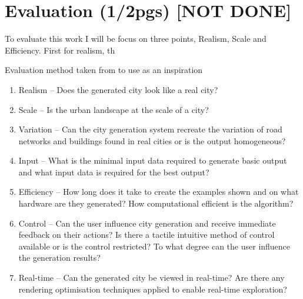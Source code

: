 
% 
% 

\section{Evaluation (1/2pgs)  [NOT DONE]}
\label{sec:evaluation}

To evaluate this work I will be focus on three points, Realism, Scale and Efficiency. 
First for realism, th

Evaluation method taken from \cite{Kelly} to use as an inspiration
\begin{enumerate}
	\item Realism – Does the generated city look like a real city?
	\item Scale – Is the urban landscape at the scale of a city?
	\item Variation – Can the city generation system recreate the variation of road networks and buildings found in real cities or is the output homogeneous?
	\item Input – What is the minimal input data required to generate basic output and what input data is required for the best output?
	\item Efficiency – How long does it take to create the examples shown and on what hardware are they generated? How computational efficient is the algorithm?
	\item Control – Can the user influence city generation and receive immediate feedback on their actions? Is there a tactile intuitive method of control available or is the control restricted? To what degree can the user influence the generation results?
	\item Real-time – Can the generated city be viewed in real-time? Are there any rendering optimisation techniques applied to enable real-time exploration?
\end{enumerate}
